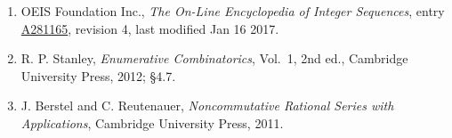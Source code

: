 \documentclass[11pt]{article}
\theoremstyle{definition}
\begin{document}
\begin{enumerate}

\item OEIS Foundation Inc., \emph{The On-Line Encyclopedia of Integer Sequences}, entry \href{https://oeis.org/A281165}{A281165}, revision 4, last modified Jan 16 2017.

\item R. P. Stanley, \emph{Enumerative Combinatorics}, Vol.~1, 2nd ed., Cambridge University Press, 2012; \S4.7.

\item J. Berstel and C. Reutenauer, \emph{Noncommutative Rational Series with Applications}, Cambridge University Press, 2011.

\end{enumerate}
\end{document}
